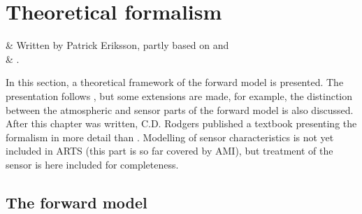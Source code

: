 %
%
\chapter{Theoretical formalism}
 \label{sec:formalism}

%
%
 & Written by Patrick Eriksson, partly 
           based on \citet{eriksson:99} and \\ & \citet{eriksson:00a}. \\
\stophistory



%
%
In this section, a theoretical framework of the forward model is
presented. The presentation follows \citet{rodgers:90}, but some
extensions are made, for example, the distinction between the
atmospheric and sensor parts of the forward model is also discussed.
After this chapter was written, C.D. Rodgers published a textbook
\citep{rodgers:00} presenting the formalism in more detail than
\citet{rodgers:90}. Modelling of sensor characteristics is not yet
included in ARTS (this part is so far covered by AMI), but treatment
of the sensor is here included for completeness.



\section{The forward model}
 \label{sec:formalism:fm}
 
